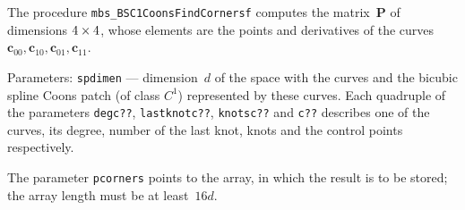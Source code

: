 \vspace{\bigskipamount}
\begin{sloppypar}
The procedure \texttt{mbs\_BSC1CoonsFindCornersf} computes the matrix~$\bm{P}$
of dimensions $4\times\nobreak 4$, whose elements are the points and derivatives
of the curves $\bm{c}_{00},\bm{c}_{10},\bm{c}_{01},\bm{c}_{11}$.%
\end{sloppypar}

Parameters: \texttt{spdimen} --- dimension~$d$ of the space with the
curves and the bicubic spline Coons patch (of class $C^1$) represented
by these curves. Each quadruple of the parameters \texttt{degc??},
\texttt{lastknotc??}, \texttt{knotsc??} and \texttt{c??}    
describes one of the curves, its degree, number of the last knot, knots
and the control points respectively.

The parameter \texttt{pcorners} points to the array, in which the result
is to be stored; the array length must be at least~$16d$.


